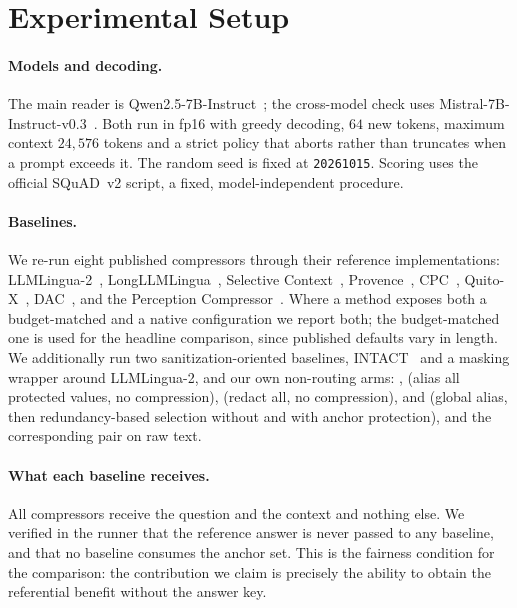\section{Experimental Setup}
\label{sec:setup}

\paragraph{Models and decoding.}
The main reader is Qwen2.5-7B-Instruct~\cite{qwen25}; the cross-model check uses
Mistral-7B-Instruct-v0.3~\cite{mistral7b}. Both run in fp16 with greedy decoding,
$64$ new tokens, maximum context $24{,}576$ tokens and a strict policy that aborts rather
than truncates when a prompt exceeds it. The random seed is fixed at \texttt{20261015}.
Scoring uses the official SQuAD~v2 script, a fixed, model-independent procedure.

\paragraph{Baselines.}
We re-run eight published compressors through their reference implementations:
LLMLingua-2~\cite{llmlingua2}, LongLLMLingua~\cite{longllmlingua}, Selective
Context~\cite{selective_context}, Provence~\cite{provence}, CPC~\cite{cpc},
Quito-X~\cite{quitox}, DAC~\cite{dac}, and the Perception
Compressor~\cite{perception_compressor}. Where a method exposes both a budget-matched and a
native configuration we report both; the budget-matched one is used for the headline
comparison, since published defaults vary in length. We additionally run two
sanitization-oriented baselines, INTACT~\cite{intact} and a masking wrapper around
LLMLingua-2, and our own non-routing arms: ,
 (alias all protected values, no compression),  (redact all, no
compression),  and  (global alias, then
redundancy-based selection without and with anchor protection), and the corresponding
 pair on raw text.

\paragraph{What each baseline receives.}
All compressors receive the question and the context and nothing else. We verified in the
runner that the reference answer is never passed to any baseline, and that no baseline
consumes the anchor set. This is the fairness condition for the comparison: the
contribution we claim is precisely the ability to obtain the referential benefit without
the answer key.

